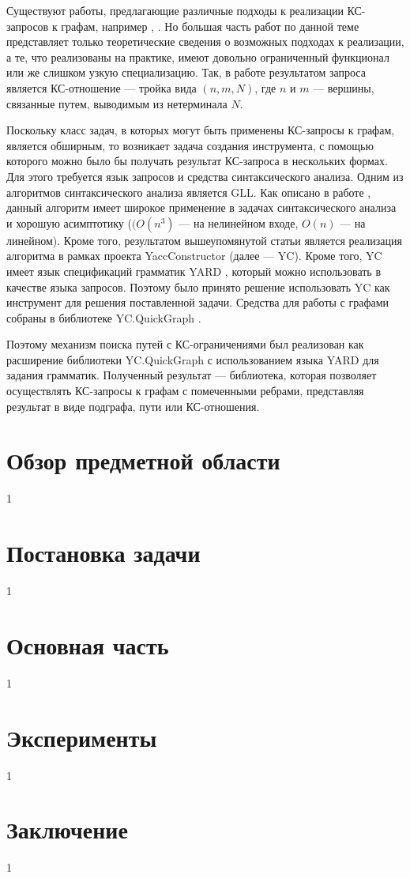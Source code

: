 \documentclass[14pt]{matmex-diploma-custom}
\begin{document}
	Существуют работы, предлагающие различные подходы к реализации КС-запросов к графам, например \cite{sevon2008subgraph}, \cite{hellings2014conjunctive}. Но большая часть работ по данной теме представляет только теоретические сведения о возможных подходах к реализации, а те, что реализованы на практике, имеют довольно ограниченный функционал или же слишком узкую специализацию. Так, в работе \cite{hellings2014conjunctive} результатом запроса является КС-отношение --- тройка вида \((n, m, N)\), где \(n\) и \(m\) --- вершины, связанные путем, выводимым из нетерминала \(N\). 
	
	Поскольку класс задач, в которых могут быть применены КС-запросы к графам, является обширным, то возникает задача создания инструмента, с помощью которого можно было бы получать результат КС-запроса в нескольких формах. Для этого требуется язык запросов и средства синтаксического анализа. Одним из алгоритмов синтаксического анализа является GLL\cite{gll}. Как описано в работе \cite{ragRelaxedParsing}, данный алгоритм имеет широкое применение в задачах синтаксического анализа и хорошую асимптотику (\((O(n^3)\) --- на нелинейном входе, \(O(n)\)  --- на линейном). Кроме того, результатом вышеупомянутой статьи является реализация алгоритма в рамках проекта YaccConstructor \cite{YaccConstructorPage} (далее --- YC). Кроме того, YC имеет язык спецификаций грамматик YARD \cite{YARD}, который можно использовать в качестве языка запросов. Поэтому было принято решение использовать YC как инструмент для решения поставленной задачи. Средства для работы с графами собраны в библиотеке YC.QuickGraph \cite{YC.QuickGraph}.
	
	Поэтому механизм поиска путей с КС-ограничениями был реализован как расширение библиотеки YC.QuickGraph с использованием языка YARD для задания грамматик. Полученный результат --- библиотека, которая позволяет осуществлять КС-запросы к графам с помеченными ребрами, представляя результат в виде подграфа, пути или КС-отношения.
	
\section{Обзор предметной области}
1
\section{Постановка задачи}
1
\section{Основная часть}
1
\section{Эксперименты}
1
\section*{Заключение}
1
\setmonofont[Mapping=tex-text]{CMU Typewriter Text}


\end{document}
